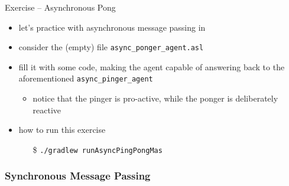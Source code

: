 \documentclass[presentation]{beamer}\mode<presentation>{\usetheme{AMSBolognaFC}}
\begin{document}
\begin{frame}[c, allowframebreaks]{Exercise \theJasonExample{} -- Asynchronous Pong}
\begin{itemize}
    \item let's practice with asynchronous message passing in \jason{}
    
    \vspace{.3cm}
    
    \item consider the (empty) file \texttt{async\_ponger\_agent.asl}
    
    \vspace{.3cm}
    
    \item fill it with some \jason{} code, making the agent capable of answering back to the aforementioned \texttt{async\_pinger\_agent}
    \begin{itemize}
        \item notice that the pinger is pro-active, while the ponger is deliberately reactive 
    \end{itemize}
    
    \vspace{.3cm}
    
    \item how to run this exercise
    \begin{itemize}
        \item[\$] \texttt{./gradlew run\alert{AsyncPingPong}Mas}
    \end{itemize}
    
\end{itemize}
\end{frame}

\subsubsection{Synchronous Message Passing}
\end{document}

